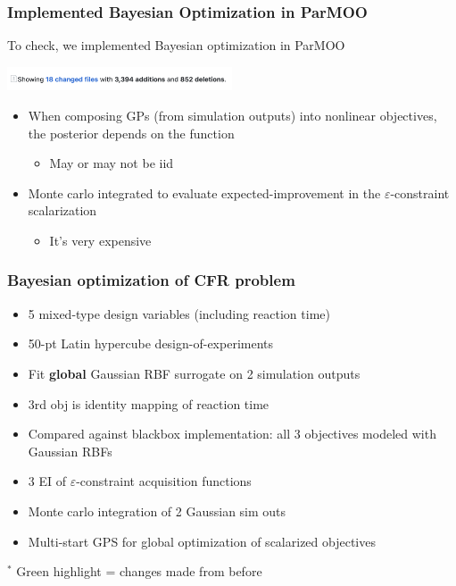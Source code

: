 \documentclass[aspectratio=169]{beamer}
\begin{document}
\begin{frame}\frametitle{Implemented Bayesian Optimization in ParMOO}

To check, we implemented Bayesian optimization in ParMOO

\bigskip
\begin{center}
\includegraphics[width=0.5\textwidth]{../img/moo_new/bo-pr.png}
\end{center}

\begin{itemize}
\item When composing GPs (from simulation outputs) into nonlinear objectives, the posterior depends on the function
\begin{itemize}
\item May or may not be iid
\end{itemize}
\item Monte carlo integrated to evaluate expected-improvement in the $\varepsilon$-constraint scalarization
\begin{itemize}
\item It's very expensive
\end{itemize}
\end{itemize}
\end{frame}

\begin{frame}\frametitle{Bayesian optimization of CFR problem}
\begin{itemize}
\item 5 mixed-type design variables (including reaction time)
\item 50-pt Latin hypercube design-of-experiments
\item Fit {\bf global} Gaussian RBF surrogate on 2 simulation outputs
\item {\color{blue}3rd obj is identity mapping of reaction time}
\item {\color{red}Compared against blackbox implementation: all 3 objectives
modeled with Gaussian RBFs}
\item {\color{green}3 EI of $\varepsilon$-constraint acquisition functions}
\item {\color{green}Monte carlo integration of 2 Gaussian sim outs}
\item {\color{green}Multi-start GPS for global optimization of scalarized objectives}
\end{itemize}

\bigskip

$^*${\color{green} Green highlight} = changes made from before
\end{frame}
\end{document}
